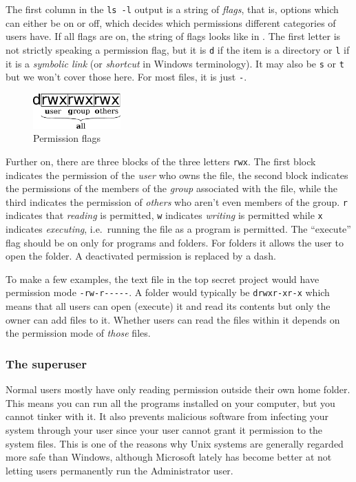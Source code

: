The first column in the \verb|ls -l| output is a string of \emph{flags}, that is, options which can either be on or off, which decides which permissions different categories of users have. If all flags are on, the string of flags looks like in . The first letter is not strictly speaking a permission flag, but it is \verb|d| if the item is a directory or \verb|l| if it is a \emph{symbolic link} (or \emph{shortcut} in Windows terminology). It may also be \verb|s| or \verb|t| but we won't cover those here. For most files, it is just \verb|-|.

\begin{figure}
	\centering
	\includegraphics[width=0.3\textwidth]{graphics/permissions.pdf}
	\caption{Permission flags}
	\label{fig:bash:permissions}
\end{figure}

Further on, there are three blocks of the three letters \verb|rwx|. The first block indicates the permission of the \emph{user} who owns the file, the second block indicates the permissions of the members of the \emph{group} associated with the file, while the third indicates the permission of \emph{others} who aren't even members of the group. \verb|r| indicates that \emph{reading} is permitted, \verb|w| indicates \emph{writing} is permitted while \verb|x| indicates \emph{executing}, i.e.\ running the file as a program is permitted. The ``execute'' flag should be on only for programs and folders. For folders it allows the user to open the folder. A deactivated permission is replaced by a dash.

To make a few examples, the text file in the top secret project would have permission mode \verb|-rw-r-----|. A folder would typically be \verb|drwxr-xr-x| which means that all users can open (execute) it and read its contents but only the owner can add files to it. Whether users can read the files within it depends on the permission mode of \emph{those} files.

\subsubsection{The superuser}
Normal users mostly have only reading permission outside their own home folder. This means you can run all the programs installed on your computer, but you cannot tinker with it. It also prevents malicious software from infecting your system through your user since your user cannot grant it permission to the system files. This is one of the reasons why Unix systems are generally regarded more safe than Windows, although Microsoft lately has become better at not letting users permanently run the Administrator user.

